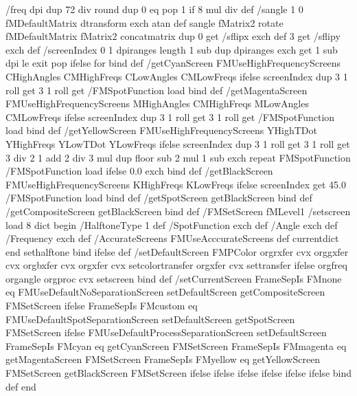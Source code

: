 /freq dpi dup 72 div round dup 0 eq {pop 1} if 8 mul div def
/sangle 1 0 fMDefaultMatrix dtransform exch atan def
	sangle fMatrix2 rotate 
	fMDefaultMatrix fMatrix2 concatmatrix 
	dup 0 get /sflipx exch def
	    3 get /sflipy exch def
/screenIndex {
	0 1 dpiranges length 1 sub { dup dpiranges exch get 1 sub dpi le {exit} {pop} ifelse } for
} bind def
/getCyanScreen {
	FMUseHighFrequencyScreens { CHighAngles CMHighFreqs} {CLowAngles CMLowFreqs} ifelse
		screenIndex dup 3 1 roll get 3 1 roll get /FMSpotFunction load
} bind def
/getMagentaScreen {
	FMUseHighFrequencyScreens { MHighAngles CMHighFreqs } {MLowAngles CMLowFreqs} ifelse
		screenIndex dup 3 1 roll get 3 1 roll get /FMSpotFunction load
} bind def
/getYellowScreen {
	FMUseHighFrequencyScreens { YHighTDot YHighFreqs} { YLowTDot YLowFreqs } ifelse
		screenIndex dup 3 1 roll get 3 1 roll get { 3 div
			{2 { 1 add 2 div 3 mul dup floor sub 2 mul 1 sub exch} repeat
			FMSpotFunction } } {/FMSpotFunction load } ifelse
			0.0 exch
} bind def
/getBlackScreen  {
	FMUseHighFrequencyScreens { KHighFreqs } { KLowFreqs } ifelse
		screenIndex get 45.0 /FMSpotFunction load 
} bind def
/getSpotScreen {
	getBlackScreen
} bind def
/getCompositeScreen {
	getBlackScreen
} bind def
/FMSetScreen 
	fMLevel1 { /setscreen load 
	}{ {
		8 dict begin
		/HalftoneType 1 def
		/SpotFunction exch def
		/Angle exch def
		/Frequency exch def
		/AccurateScreens FMUseAcccurateScreens def
		currentdict end sethalftone
	} bind } ifelse
def
/setDefaultScreen {
	FMPColor {
		orgrxfer cvx orggxfer cvx orgbxfer cvx orgxfer cvx setcolortransfer
	}
	{
		orgxfer cvx settransfer
	} ifelse
	orgfreq organgle orgproc cvx setscreen
} bind def
/setCurrentScreen {
	FrameSepIs FMnone eq {
		FMUseDefaultNoSeparationScreen {
			setDefaultScreen
		} {
			getCompositeScreen FMSetScreen
		} ifelse
	} {
		FrameSepIs FMcustom eq {
			FMUseDefaultSpotSeparationScreen {
				setDefaultScreen
			} {
				getSpotScreen FMSetScreen
			} ifelse
		} {
			FMUseDefaultProcessSeparationScreen {
				setDefaultScreen
			} {
				FrameSepIs FMcyan eq {
					getCyanScreen FMSetScreen
				} {
					FrameSepIs FMmagenta eq {
						getMagentaScreen FMSetScreen
					} {
						FrameSepIs FMyellow eq {
							getYellowScreen FMSetScreen
						} {
							getBlackScreen FMSetScreen
						} ifelse
					} ifelse
				} ifelse
			} ifelse
		} ifelse
	} ifelse 
} bind def
end
	
